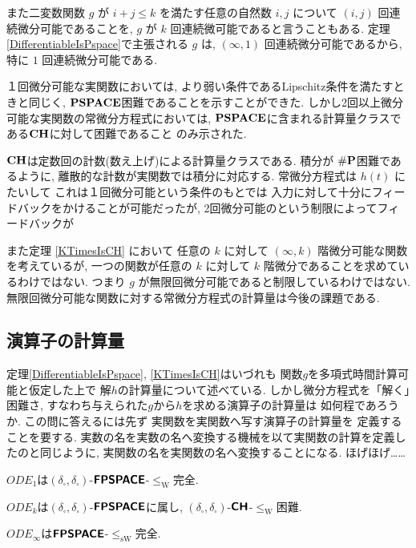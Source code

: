 また二変数関数 $g$ が
$i+j \le k$ を満たす任意の自然数 $i,j$ について
$(i,j)$ 回連続微分可能であることを, 
$g$ が $k$ 回連続微可能であると言うこともある.
定理\ref{DifferentiableIsPspace}で主張される $g$ は, 
$(\infty, 1)$ 回連続微分可能であるから, 
特に $1$ 回連続微分可能である. 


１回微分可能な実関数においては, より弱い条件であるLipschitz条件を満たすときと同じく,
$\mathbf{PSPACE}$困難であることを示すことができた.
しかし2回以上微分可能な実関数の常微分方程式においては,
$\mathbf{PSPACE}$に含まれる計算量クラスである$\mathbf{CH}$に対して困難であること
のみ示された.

$\mathbf{CH}$は定数回の計数(数え上げ)による計算量クラスである.
積分が $\#\mathbf{P}$困難であるように,
離散的な計数が実関数では積分に対応する.
常微分方程式は $h(t)$ にたいして
これは１回微分可能という条件のもとでは
入力に対して十分にフィードバックをかけることが可能だったが,
2回微分可能のという制限によってフィードバックが



 また定理 \ref{KTimesIsCH} において
 任意の $k$ に対して $(\infty, k)$ 階微分可能な関数を考えているが,
 一つの関数が任意の $k$ に対して $k$ 階微分であることを求めているわけではない.
 つまり $g$ が無限回微分可能であると制限しているわけではない. 
 無限回微分可能な関数に対する常微分方程式の計算量は今後の課題である.


\subsection{演算子の計算量}

定理\ref{DifferentiableIsPspace}, 
\ref{KTimesIsCH}はいづれも
関数$g$を多項式時間計算可能と仮定した上で
解$h$の計算量について述べている. 
しかし微分方程式を「解く」困難さ, 
すなわち与えられた$g$から$h$を求める演算子の計算量は
如何程であろうか. 
この問に答えるには先ず
実関数を実関数へ写す演算子の計算量を
定義することを要する. 
実数の名を実数の名へ変換する機械を以て実関数の計算を定義したのと同じように, 
実関数の名を実関数の名へ変換することになる. 
ほげほげ……

\newcommand{\OpDiffIVP}{\mathit{ODE}}
\newcommand{\deltabox}{\delta _\square}
\newcommand{\classtwofont}[1]{\text{\bfseries \sffamily \upshape #1}}
\newcommand{\classFPSPACEtwo}{\classtwofont{FPSPACE}}
\newcommand{\classCHtwo}{\classtwofont{CH}}
\newcommand{\redW}{\leq _{\mathrm W}}
\newcommand{\redSW}{\leq _{\mathrm{sW}}}

\begin{theorem}
$\OpDiffIVP _1$は$(\deltabox, \deltabox)$-$\classFPSPACEtwo$-$\redW$完全. 
\end{theorem}

\begin{theorem}
$\OpDiffIVP _k$は$(\deltabox, \deltabox)$-$\classFPSPACEtwo$に属し, 
$(\deltabox, \deltabox)$-$\classCHtwo$-$\redW$困難. 
\end{theorem}

\begin{theorem}
$\OpDiffIVP _\infty$は$\classFPSPACEtwo$-$\redSW$完全. 
\end{theorem}

